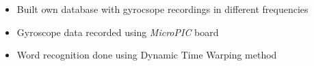 \documentclass[10pt,a4paper]{altacv}
\begin{document}
\divider



\begin{itemize}
    \item \small{Built own database with gyrocsope recordings in different frequencies}
    \item \small{Gyroscope data recorded using \textit{MicroPIC} board}
    \item \small{Word recognition done using Dynamic Time Warping method}
\end{itemize}
\end{document}

